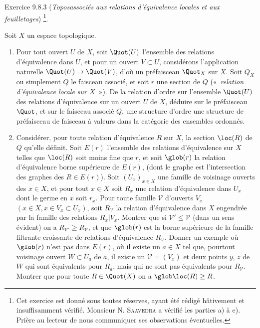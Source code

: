\documentclass[10pt]{../fichiers-configuration-latex/smfart}
\begin{document}
\begin{enonce*}[remark]{Exercice 9.8.3}
(\emph{Topos\pageoriginale associés aux relations d'équivalence
locales et aux feuilletages}) \footnote[1]{Cet exercice est donné
sous toutes réserves, ayant été rédigé hâtivement et insuffisamment
vérifié. Monsieur N. \textsc{Saavedra} a vérifié les parties a) à
e). Prière au lecteur de nous communiquer ses observations
éventuelles.}.

Soit $X$ un espace topologique.
\begin{enumerate}
\renewcommand{\theenumi}{\alph{enumi}}
\renewcommand{\labelenumi}{\theenumi)}
\item Pour tout ouvert $U$ de $X$, soit $\Quot(U)$ l'ensemble des
relations d'équivalence dans $U$, et pour un ouvert $V\subset U$,
considérons l'application naturelle $\Quot(U)\rightarrow \Quot(V)$,
d'où un préfaisceau $\Quot_X$ sur $X$. Soit $Q_X$ ou simplement $Q$
le faisceau associé, et soit $r$ une section de $Q$ (« \emph{relation d'équivalence locale sur $X$} »). De la relation
d'ordre sur l'ensemble $\Quot(U)$ des relations d'équivalence sur un
ouvert $U$ de $X$, déduire sur le préfaisceau $\Quot$, et sur le
faisceau associé $Q$, une structure d'ordre \ie une structure de
préfaisceau \resp de faisceau à valeurs dans la catégorie des
ensembles ordonnés.

\item Considérer, pour toute relation d'équivalence $R$ sur $X$, la
section $\loc(R)$ de $Q$ qu'elle définit. Soit $E(r)$ l'ensemble des
relations d'équivalence sur $X$ telles que $\loc(R)$ soit moins fine
que $r$, et soit $\glob(r)$ la relation d'équivalence borne
supérieure de $E(r)$, (dont le graphe est l'intersection des graphes
des $R\in E(r)$). Soit $(U_x)_{x\in X}$ une famille de voisinage
ouverts des $x\in X$, et pour tout $x\in X$ soit $R_x$ une relation
d'équivalence dans $U_x$ dont le germe en $x$ soit $r_x$. Pour toute
famille $𝒱$ d'ouverts $V_x$ $(x\in X, x\in V_x\subset U_x)$,
soit $R_{𝒱}$ la relation d'équivalence dans $X$ engendrée
par la famille des relations $R_x| V_x$. Montrer que si
$𝒱'\leq 𝒱$ (dans un sens évident) on a
$R_{𝒱'}\geq R_{𝒱}$, et que $\glob(r)$ est la borne
supérieure de la famille filtrante croissante de relations
d'équivalence $R_{𝒱}$. Donner un exemple où $\glob(r)$ n'est
pas dans $E(r)$, \ie où il existe un $a\in X$ tel que,
pour\pageoriginale tout voisinage ouvert $W\subset U_a$ de $a$, il
existe un $𝒱=(V_x)$ et deux points $y$, $z$ de $W$ qui sont
équivalents pour $R_a$, mais qui ne sont pas équivalents pour
$R_{𝒱}$. Montrer que pour toute $R\in \Quot(X)$ on a
$\glob\loc(R)\geq R$.


\end{enumerate}
\end{enonce*}
\end{document}
